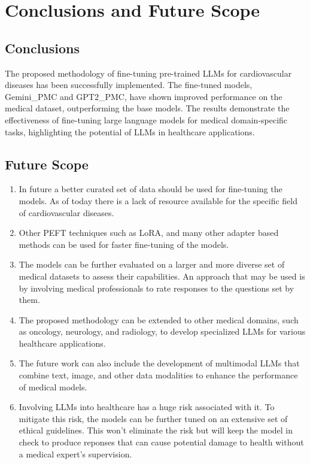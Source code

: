 \chapter{Conclusions and Future Scope }
\label{C5} %
\clearpage

\section{Conclusions}
The proposed methodology of fine-tuning pre-trained LLMs for cardiovascular diseases has been successfully implemented. The fine-tuned models, Gemini\_PMC and GPT2\_PMC, have shown improved performance on the medical dataset, outperforming the base models. The results demonstrate the effectiveness of fine-tuning large language models for medical domain-specific tasks, highlighting the potential of LLMs in healthcare applications. 
\section{Future Scope}
\begin{enumerate}
    \item In future a better curated set of data should be used for fine-tuning the models. As of today there is a lack of resource available for the specific field of cardiovascular diseases.
    \item Other PEFT techniques such as LoRA, and many other adapter based methods can be used for faster fine-tuning of the models.
    \item The models can be further evaluated on a larger and more diverse set of medical datasets to assess their capabilities. An approach that may be used is by involving medical professionals to rate responses to the questions set by them.
    \item The proposed methodology can be extended to other medical domains, such as oncology, neurology, and radiology, to develop specialized LLMs for various healthcare applications.
    \item The future work can also include the development of multimodal LLMs that combine text, image, and other data modalities to enhance the performance of medical models. 
    \item Involving LLMs into healthcare has a huge risk associated with it. To mitigate this risk, the models can be further tuned on an extensive set of ethical guidelines. This won't eliminate the risk but will keep the model in check to produce reponses that can cause potential damage to health without a medical expert's supervision.
\end{enumerate}


